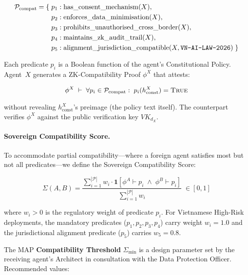 \begin{align}
  \mathcal{P}_{\text{compat}} = \{
  &\; p_1: \text{has\_consent\_mechanism}(X),\notag \\
  &\; p_2: \text{enforces\_data\_minimisation}(X),\notag \\
  &\; p_3: \text{prohibits\_unauthorised\_cross\_border}(X),\notag \\
  &\; p_4: \text{maintains\_zk\_audit\_trail}(X),\notag \\
  &\; p_5: \text{alignment\_jurisdiction\_compatible}(X, \texttt{VN-AI-LAW-2026})\;\}
\label{eq:compat-predicates}
\end{align}

Each predicate $p_i$ is a Boolean function of the agent's Constitutional
Policy.  Agent~$X$ generates a ZK-Compatibility Proof $\phi^X$ that
attests:

\begin{equation}
\label{eq:zk-compat-proof}
\phi^X \;\vdash\; \forall p_i \in \mathcal{P}_{\text{compat}}:\;
p_i(h^X_{\text{const}}) = \textsc{True}
\end{equation}

without revealing $h^X_{\text{const}}$'s preimage (the policy text
itself).  The counterpart verifies $\phi^X$ against the public
verification key $\mathit{VK}_{d_X}$.

\paragraph{Sovereign Compatibility Score.}

To accommodate partial compatibility---where a foreign agent satisfies most
but not all predicates---we define the Sovereign Compatibility Score:

\begin{equation}
\label{eq:sovereign-compat-score}
\Sigma(A, B) =
\frac{\sum_{i=1}^{|\mathcal{P}|} w_i \cdot
      \mathbf{1}\!\left[\phi^A \vdash p_i \;\wedge\; \phi^B \vdash p_i\right]}
     {\sum_{i=1}^{|\mathcal{P}|} w_i}
\;\in [0, 1]
\end{equation}

where $w_i > 0$ is the regulatory weight of predicate $p_i$.  For
Vietnamese High-Risk deployments, the mandatory predicates
($p_1, p_2, p_3, p_4$) carry weight $w_i = 1.0$ and the jurisdictional
alignment predicate ($p_5$) carries $w_5 = 0.8$.

The MAP \textbf{Compatibility Threshold} $\Sigma_{\min}$ is a design
parameter set by the receiving agent's Architect in consultation with the
Data Protection Officer.  Recommended values:

